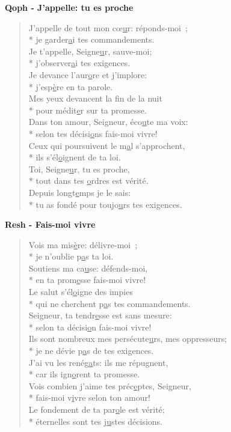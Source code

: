 \textbf{Qoph - J’appelle: tu es proche}
\begin{verse}
J’appelle de tout mon cœ\underline{u}r: réponds-moi ; \\*
je garder\underline{a}i tes commandements. \\
Je t’appelle, Seigne\underline{u}r, sauve-moi; \\*
j’observer\underline{a}i tes exigences. \\
Je devance l’aur\underline{o}re et j’implore: \\*
j’esp\underline{è}re en ta parole. \\
Mes yeux devancent la f\underline{i}n de la nuit \\*
pour médit\underline{e}r sur ta promesse. \\
Dans ton amour, Seigneur, éco\underline{u}te ma voix: \\*
selon tes décisi\underline{o}ns fais-moi vivre! \\
Ceux qui poursuivent le m\underline{a}l s’approchent, \\*
ils s’él\underline{o}ignent de ta loi. \\
Toi, Seigne\underline{u}r, tu es proche, \\*
tout dans tes \underline{o}rdres est vérité. \\
Depuis longt\underline{e}mps je le sais: \\*
tu as fondé pour toujo\underline{u}rs tes exigences. \\
\end{verse}
\textbf{Resh - Fais-moi vivre}
\begin{verse}
Vois ma mis\underline{è}re: délivre-moi ; \\*
je n’oublie p\underline{a}s ta loi. \\
Soutiens ma ca\underline{u}se: défends-moi, \\*
en ta prom\underline{e}sse fais-moi vivre! \\
Le salut s’él\underline{o}igne des impies \\*
qui ne cherchent p\underline{a}s tes commandements. \\
Seigneur, ta tendr\underline{e}sse est sans mesure: \\*
selon ta décisi\underline{o}n fais-moi vivre! \\
Ils sont nombreux mes persécute\underline{u}rs, mes oppresseurs; \\*
je ne dévie p\underline{a}s de tes exigences. \\
J’ai vu les renég\underline{a}ts: ils me répugnent, \\*
car ils ign\underline{o}rent ta promesse. \\
Vois combien j’aime tes préc\underline{e}ptes, Seigneur, \\*
fais-moi v\underline{i}vre selon ton amour! \\
Le fondement de ta par\underline{o}le est vérité; \\*
éternelles sont tes j\underline{u}stes décisions. \\
\end{verse}
